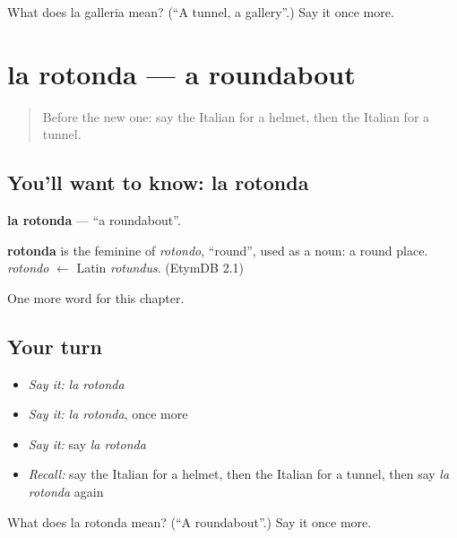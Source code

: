 \begin{tcolorbox}[breakable,colback=teal!4,colframe=teal!35!black,title={Before you move on}]
What does la galleria mean? (\textquotedblleft{}A tunnel, a gallery\textquotedblright{}.) Say it once more.
\end{tcolorbox}
\section[la rotonda]{la rotonda — a roundabout}

\label{lesson:IT-C199-rotonda}



\begin{quote}
Before the new one: say the Italian for a helmet, then the Italian for a tunnel.
\end{quote}

\subsection*{You'll want to know: la rotonda}
\textbf{la rotonda} — \textquotedblleft{}a roundabout\textquotedblright{}.

\begin{cousinweb}
\textbf{rotonda} is the feminine of \emph{rotondo}, \textquotedblleft{}round\textquotedblright{}, used as a noun: a round place. \emph{rotondo} $\leftarrow$ Latin \emph{rotundus}. (EtymDB 2.1)
\end{cousinweb}

\begin{grammarlens}[title={What you've built}]
One more word for this chapter.
\end{grammarlens}

\subsection*{Your turn}
\begin{itemize}
\raggedright
  \item \emph{Say it:} \emph{la rotonda}
  \item \emph{Say it:} \emph{la rotonda}, once more
  \item \emph{Say it:} say \emph{la rotonda}
  \item \emph{Recall:} say the Italian for a helmet, then the Italian for a tunnel, then say \emph{la rotonda} again
\end{itemize}

\begin{tcolorbox}[breakable,colback=teal!4,colframe=teal!35!black,title={Before you move on}]
What does la rotonda mean? (\textquotedblleft{}A roundabout\textquotedblright{}.) Say it once more.
\end{tcolorbox}
